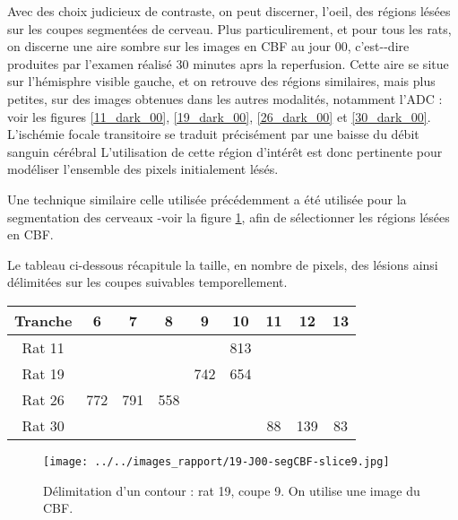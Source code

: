 \par
Avec des choix judicieux de contraste, on peut discerner,  l'oeil, des r\'egions l\'es\'ees sur les coupes segment\'ees de cerveau. %
Plus particulirement, et pour tous les rats, on discerne une aire sombre sur les images en CBF au jour 00, %
c'est--dire produites par l'examen r\'ealis\'e 30 minutes aprs la reperfusion. %
Cette aire se situe sur l'h\'emisphre visible  gauche, et on retrouve des r\'egions similaires, mais plus petites, %
sur des images obtenues dans les autres modalit\'es, notamment l'ADC : %
voir les figures \ref{11_dark_00}, \ref{19_dark_00}, \ref{26_dark_00} et \ref{30_dark_00}. %
L'isch\'emie focale transitoire se traduit pr\'ecis\'ement par une baisse du d\'ebit sanguin c\'er\'ebral %
L'utilisation de cette r\'egion d'int\'er\^et est donc pertinente pour mod\'eliser l'ensemble des pixels initialement l\'es\'es.

\etoile
Une technique similaire  celle utilis\'ee pr\'ec\'edemment a \'et\'e utilis\'ee pour la segmentation des cerveaux -voir la figure \ref{cbf_seg_19}, %
afin de s\'electionner les r\'egions l\'es\'ees en CBF.

\par
Le tableau ci-dessous r\'ecapitule la taille, en nombre de pixels, des l\'esions ainsi d\'elimit\'ees sur les coupes suivables temporellement.

\begin{multicols}{2}
\begin{tabular}{|c|c|c|c|c|c|c|c|c|}
\hline
\small{Tranche}&6&7&8&9&10&11&12&13
\\
\hline
Rat 11&&&&&813&&&
\\
\hline
Rat 19&&&&742&654&&&
\\
\hline
Rat 26&772&791&558&&&&&
\\
\hline
Rat 30&&&&&&88&139&83
\\
\hline
\end{tabular}

\columnbreak
\begin{figure}[H]
\begin{center}
\texttt{[image: ../../images\_rapport/19-J00-segCBF-slice9.jpg]}
\end{center}
\caption{D\'elimitation d'un contour : rat 19, coupe 9. On utilise une image du CBF.}
\label{cbf_seg_19}
\end{figure}
\end{multicols}



